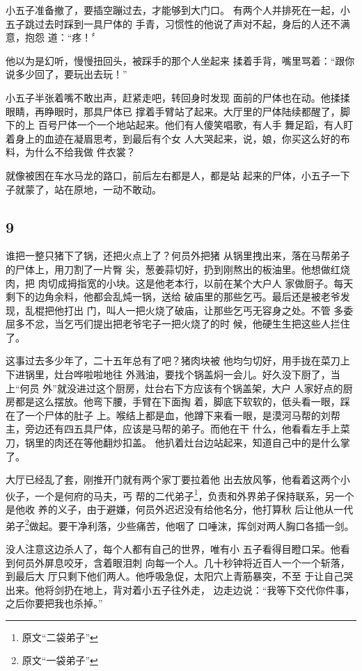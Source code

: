 小五子准备撤了，要插空蹦过去，才能够到大门口。
有两个人并排死在一起，小五子跳过去时踩到一具尸体的
手青，习惯性的他说了声对不起，身后的人还不满意，抱怨
道：“疼！〞

他以为是幻听，慢慢扭回头，被踩手的那个人坐起来
揉着手背，嘴里骂着：“跟你说多少回了，要玩出去玩！”

小五子半张着嘴不敢出声，赶紧走吧，转回身时发现
面前的尸体也在动。他揉揉眼睛，再睁眼时，那具尸体已
撑着手臂站了起来。大厅里的尸体陆续都醒了，脚下的上
百号尸体一个一个地站起来。他们有人傻笑唱歌，有人手
舞足蹈，有人盯着身上的血迹在凝眉思考，到最后有个女
人大哭起来，说，娘，你买这么好的布料，为什么不给我做
件衣裳？

就像被困在车水马龙的路口，前后左右都是人，都是站
起来的尸体，小五子一下子就蒙了，站在原地，一动不敢动。
\newline

{\centering\subsection{9}}

谁把一整只猪下了锅，还把火点上了？何员外把猪
从锅里拽出来，落在马帮弟子的尸体上，用刀割了一片臀
尖，葱姜蒜切好，扔到刚熬出的板油里。他想做红烧肉，把
肉切成拇指宽的小块。这是他老本行，以前在某个大户人
家做厨子。每天剩下的边角余料，他都会乱炖一锅，送给
破庙里的那些乞丐。最后还是被老爷发现，乱棍把他打出
门，叫人一把火烧了破庙，让那些乞丐无容身之处。不管
多委屈多不忿，当乞丐们提出把老爷宅子一把火烧了的时
候，他硬生生把这些人拦住了。

这事过去多少年了，二十五年总有了吧？猪肉块被
他均匀切好，用手拢在菜刀上下进锅里，灶台哗啦啦地往
外溅油，要找个锅盖焖一会儿。好久没下厨了，当上“何员
外”就没进过这个厨房，灶台右下方应该有个锅盖架，大户
人家好点的厨房都是这么摆放。他弯下腰，手臂在下面掏
着，脚底下软软的，低头看一眼，踩在了一个尸体的肚子
上。喉结上都是血，他蹲下来看一眼，是漠河马帮的刘帮
主，旁边还有四五具尸体，应该是马帮的弟子。而他在干
什么，他看看左手上菜刀，锅里的肉还在等他翻炒扣盖。
他扒着灶台边站起来，知道自己中的是什么掌了。
\newline

大厅已经乱了套，刚推开门就有两个家丁要拉着他
出去放风筝，他看着这两个小伙子，一个是何府的马夫，丐
帮的二代弟子\footnote{原文“二袋弟子”}，负责和外界弟子保持联系，另一个是他收
养的义子，由于避嫌，何员外迟迟没有给他名分，他打算秋
后让他从一代弟子\footnote{原文“一袋弟子”}做起。要干净利落，少些痛苦，他咽了
口唾沫，挥剑对两人胸口各插一剑。

没人注意这边杀人了，每个人都有自己的世界，唯有小
五子看得目瞪口呆。他看到何员外屏息咬牙，含着眼泪刺
向每一个人。几十秒钟将近百人一个一个斩落，到最后大
厅只剩下他们两人。他呼吸急促，太阳穴上青筋暴突，不至
于让自己哭出来。他将剑扔在地上，背对着小五子往外走，
边走边说：“我等下交代你件事，之后你要把我也杀掉。”

